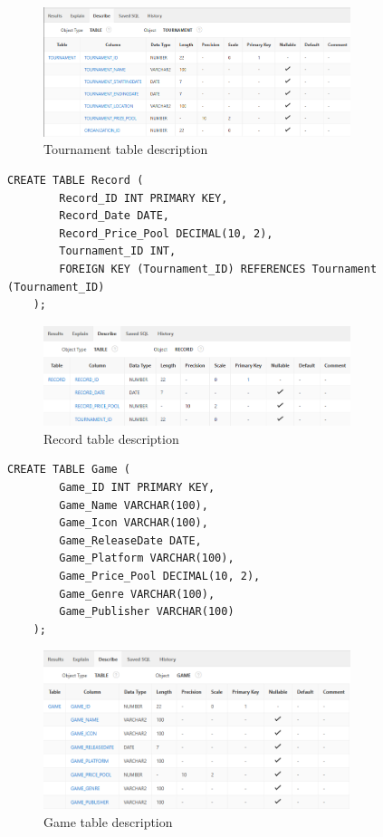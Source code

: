 \begin{figure}[H]
    \centering
    \includegraphics[width=0.8\textwidth]{images/TableDesc/TOURNAMENT.png}
    \caption{Tournament table description}
    \label{fig:tournament_table}
\end{figure}
\begin{lstlisting}[caption={Create Record table}, label={lst:create_record}]
    CREATE TABLE Record (
        Record_ID INT PRIMARY KEY,
        Record_Date DATE,
        Record_Price_Pool DECIMAL(10, 2),
        Tournament_ID INT,
        FOREIGN KEY (Tournament_ID) REFERENCES Tournament (Tournament_ID)
    );
    \end{lstlisting}
\begin{figure}[H]
    \centering
    \includegraphics[width=0.8\textwidth]{images/TableDesc/RECORD.png}
    \caption{Record table description}
    \label{fig:record_table}
\end{figure}

\begin{lstlisting}[caption={Create Game table}, label={lst:create_game}]
    CREATE TABLE Game (
        Game_ID INT PRIMARY KEY,
        Game_Name VARCHAR(100),
        Game_Icon VARCHAR(100),
        Game_ReleaseDate DATE,
        Game_Platform VARCHAR(100),
        Game_Price_Pool DECIMAL(10, 2),
        Game_Genre VARCHAR(100),
        Game_Publisher VARCHAR(100)
    );
    \end{lstlisting}
\begin{figure}[H]
    \centering
    \includegraphics[width=0.8\textwidth]{images/TableDesc/GAME.png}
    \caption{Game table description}
    \label{fig:game_table}
\end{figure}

